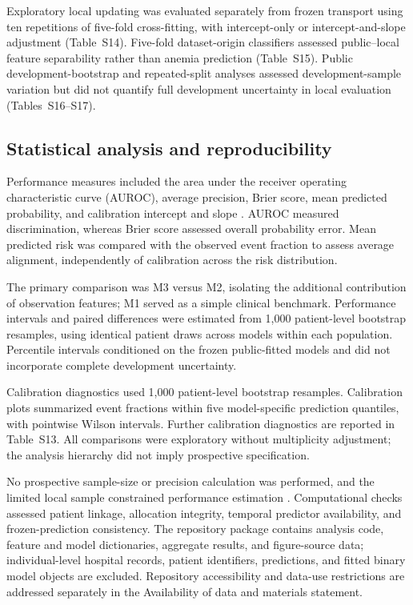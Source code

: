 \documentclass[pdflatex,sn-mathphys-num]{sn-jnl}%
\theoremstyle{thmstyleone}%
\theoremstyle{thmstyletwo}%
\theoremstyle{thmstylethree}%
\begin{document}
Exploratory local updating was evaluated separately from frozen transport using ten repetitions of five-fold cross-fitting, with intercept-only or intercept-and-slope adjustment (Table~S14). Five-fold dataset-origin classifiers assessed public--local feature separability rather than anemia prediction (Table~S15). Public development-bootstrap and repeated-split analyses assessed development-sample variation but did not quantify full development uncertainty in local evaluation (Tables~S16--S17).

\subsection{Statistical analysis and reproducibility}

Performance measures included the area under the receiver operating characteristic curve (AUROC), average precision, Brier score, mean predicted probability, and calibration intercept and slope \cite{steyerberg2010,steyerberg2014,saito2015}. AUROC measured discrimination, whereas Brier score assessed overall probability error. Mean predicted risk was compared with the observed event fraction to assess average alignment, independently of calibration across the risk distribution.

The primary comparison was M3 versus M2, isolating the additional contribution of observation features; M1 served as a simple clinical benchmark. Performance intervals and paired differences were estimated from 1,000 patient-level bootstrap resamples, using identical patient draws across models within each population. Percentile intervals conditioned on the frozen public-fitted models and did not incorporate complete development uncertainty.

Calibration diagnostics used 1,000 patient-level bootstrap resamples. Calibration plots summarized event fractions within five model-specific prediction quantiles, with pointwise Wilson intervals. Further calibration diagnostics are reported in Table~S13. All comparisons were exploratory without multiplicity adjustment; the analysis hierarchy did not imply prospective specification.

No prospective sample-size or precision calculation was performed, and the limited local sample constrained performance estimation \cite{rileysize,rileyvalidation}. Computational checks assessed patient linkage, allocation integrity, temporal predictor availability, and frozen-prediction consistency. The repository package contains analysis code, feature and model dictionaries, aggregate results, and figure-source data; individual-level hospital records, patient identifiers, predictions, and fitted binary model objects are excluded. Repository accessibility and data-use restrictions are addressed separately in the Availability of data and materials statement.
\end{document}
